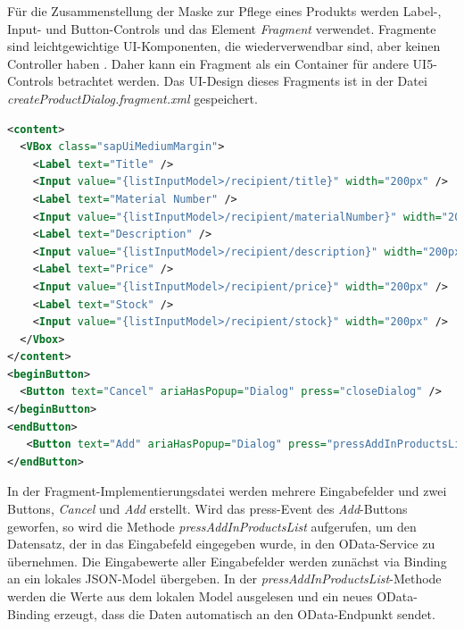 Für die Zusammenstellung der Maske zur Pflege eines Produkts werden Label-, Input- und Button-Controls und das Element \textit{Fragment} verwendet.  Fragmente sind leichtgewichtige UI-Komponenten, die wiederverwendbar sind, aber keinen Controller haben \cite{sud:s16}. Daher kann ein Fragment als ein Container für andere UI5-Controls betrachtet werden. Das UI-Design dieses Fragments ist in der Datei \textit{createProductDialog.fragment.xml} gespeichert.

\begin{lstlisting}[language=XML, caption=Auszüge aus der Fragment \texttt{createProductDialog.fragment.xml}]
<content>
  <VBox class="sapUiMediumMargin">
    <Label text="Title" />
    <Input value="{listInputModel>/recipient/title}" width="200px" />
    <Label text="Material Number" />
    <Input value="{listInputModel>/recipient/materialNumber}" width="200px" />
    <Label text="Description" />
    <Input value="{listInputModel>/recipient/description}" width="200px" />
    <Label text="Price" />
    <Input value="{listInputModel>/recipient/price}" width="200px" />
    <Label text="Stock" />
    <Input value="{listInputModel>/recipient/stock}" width="200px" />
  </Vbox>
</content>
<beginButton>
  <Button text="Cancel" ariaHasPopup="Dialog" press="closeDialog" />
</beginButton>
<endButton>
   <Button text="Add" ariaHasPopup="Dialog" press="pressAddInProductsList" />
</endButton>
\end{lstlisting}

In der Fragment-Implementierungsdatei werden mehrere Eingabefelder und zwei Buttons, \textit{Cancel} und \textit{Add} erstellt. Wird das press-Event des \textit{Add}-Buttons geworfen, so wird die Methode \textit{pressAddInProductsList} aufgerufen, um den Datensatz, der in das Eingabefeld eingegeben wurde, in den OData-Service zu übernehmen. Die Eingabewerte aller Eingabefelder werden zunächst via Binding an ein lokales JSON-Model übergeben. In der \textit{pressAddInProductsList}-Methode werden die Werte aus dem lokalen Model ausgelesen und ein neues OData-Binding erzeugt, dass die Daten automatisch an den OData-Endpunkt sendet.

